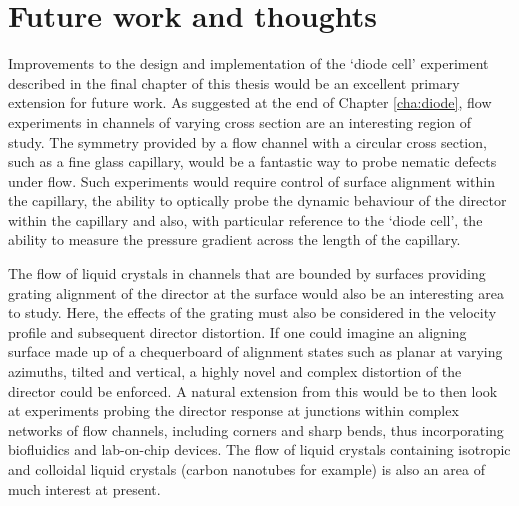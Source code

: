 \section{Future work and thoughts}
Improvements to the design and implementation of the `diode cell' experiment described in the final chapter of this thesis would be an excellent primary extension for future work. As suggested at the end of Chapter \ref{cha:diode}, flow experiments in channels of varying cross section are an interesting region of study. The symmetry provided by a flow channel with a circular cross section, such as a fine glass capillary, would be a fantastic way to probe nematic defects under flow. Such experiments would require control of surface alignment within the capillary, the ability to optically probe the dynamic behaviour of the director within the capillary and also, with particular reference to the `diode cell', the ability to measure the pressure gradient across the length of the capillary.

The flow of liquid crystals in channels that are bounded by surfaces providing grating alignment of the director at the surface would also be an interesting area to study. Here, the effects of the grating must also be considered in the velocity profile and subsequent director distortion. If one could imagine an aligning surface made up of a chequerboard of alignment states such as planar at varying azimuths, tilted and vertical, a highly novel and complex distortion of the director could be enforced. A natural extension from this would be to then look at experiments probing the director response at junctions within complex networks of flow channels, including corners and sharp bends, thus incorporating biofluidics and lab-on-chip devices. The flow of liquid crystals containing isotropic and colloidal liquid crystals (carbon nanotubes for example) is also an area of much interest at present. 

